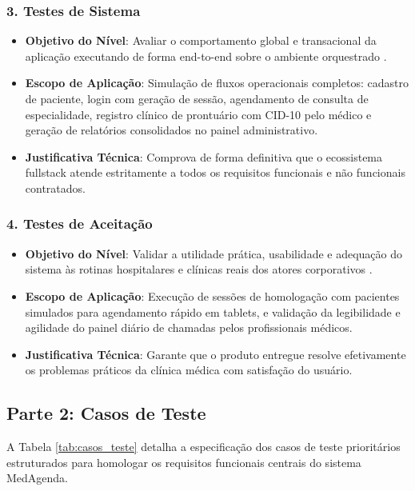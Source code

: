 \subsubsection{3. Testes de Sistema}
\begin{itemize}
    \item \textbf{Objetivo do Nível}: Avaliar o comportamento global e transacional da aplicação executando de forma end-to-end sobre o ambiente orquestrado \cite{pressman2016}.
    \item \textbf{Escopo de Aplicação}: Simulação de fluxos operacionais completos: cadastro de paciente, login com geração de sessão, agendamento de consulta de especialidade, registro clínico de prontuário com CID-10 pelo médico e geração de relatórios consolidados no painel administrativo.
    \item \textbf{Justificativa Técnica}: Comprova de forma definitiva que o ecossistema fullstack atende estritamente a todos os requisitos funcionais e não funcionais contratados.
\end{itemize}

\subsubsection{4. Testes de Aceitação}
\begin{itemize}
    \item \textbf{Objetivo do Nível}: Validar a utilidade prática, usabilidade e adequação do sistema às rotinas hospitalares e clínicas reais dos atores corporativos \cite{myers2011}.
    \item \textbf{Escopo de Aplicação}: Execução de sessões de homologação com pacientes simulados para agendamento rápido em tablets, e validação da legibilidade e agilidade do painel diário de chamadas pelos profissionais médicos.
    \item \textbf{Justificativa Técnica}: Garante que o produto entregue resolve efetivamente os problemas práticos da clínica médica com satisfação do usuário.
\end{itemize}

\subsection{Parte 2: Casos de Teste}

A Tabela \ref{tab:casos_teste} detalha a especificação dos casos de teste prioritários estruturados para homologar os requisitos funcionais centrais do sistema MedAgenda.

